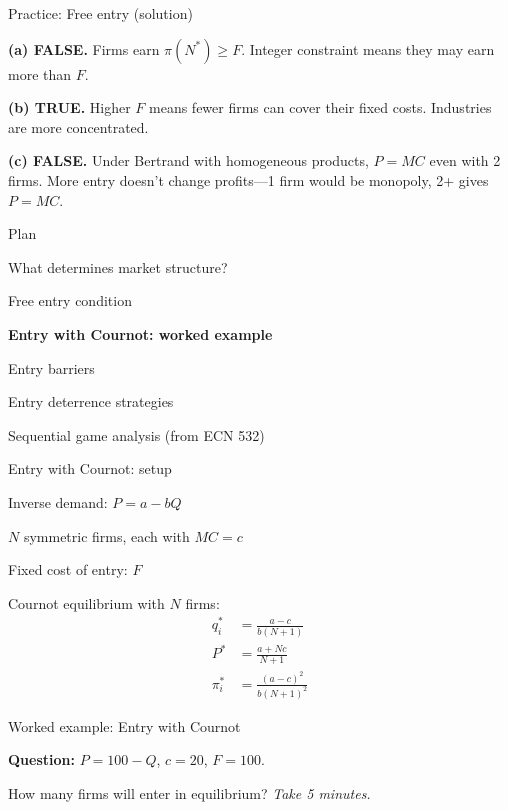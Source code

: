 \documentclass[notes,11pt, aspectratio=169]{beamer}
\newenvironment{wideitemize}{\itemize\addtolength{\itemsep}{10pt}}{\enditemize}
\newenvironment{wideenumerate}{\enumerate\addtolength{\itemsep}{10pt}}{\endenumerate}
\begin{document}
\begin{frame}{Practice: Free entry (solution)}
	\begin{wideitemize}
		\item \textbf{(a) FALSE.} Firms earn $\pi(N^*) \geq F$. Integer constraint means they may earn more than $F$.
		\item \textbf{(b) TRUE.} Higher $F$ means fewer firms can cover their fixed costs. Industries are more concentrated.
		\item \textbf{(c) FALSE.} Under Bertrand with homogeneous products, $P = MC$ even with 2 firms. More entry doesn't change profits---1 firm would be monopoly, 2+ gives $P = MC$.
	\end{wideitemize}
\end{frame}

\begin{frame}{Plan}
  \begin{wideenumerate}
    \item What determines market structure?
    \item Free entry condition
    \item \textbf{Entry with Cournot: worked example}
    \item Entry barriers
    \item Entry deterrence strategies
    \item Sequential game analysis (from ECN 532)
  \end{wideenumerate}
\end{frame}

\begin{frame}{Entry with Cournot: setup}
	\begin{wideitemize}
		\item Inverse demand: $P = a - bQ$
		\item $N$ symmetric firms, each with $MC = c$
		\item Fixed cost of entry: $F$
		\item Cournot equilibrium with $N$ firms:
		\begin{align*}
			q_i^* &= \frac{a - c}{b(N + 1)} \\
			P^* &= \frac{a + Nc}{N + 1} \\
			\pi_i^* &= \frac{(a - c)^2}{b(N + 1)^2}
		\end{align*}
	\end{wideitemize}
\end{frame}

\begin{frame}{Worked example: Entry with Cournot}
	\begin{wideitemize}
		\item \textbf{Question:} $P = 100 - Q$, $c = 20$, $F = 100$.
		\item How many firms will enter in equilibrium?
	\end{wideitemize}
	\vspace{15pt}
	\centering
	\textit{Take 5 minutes.}
\end{frame}
\end{document}
